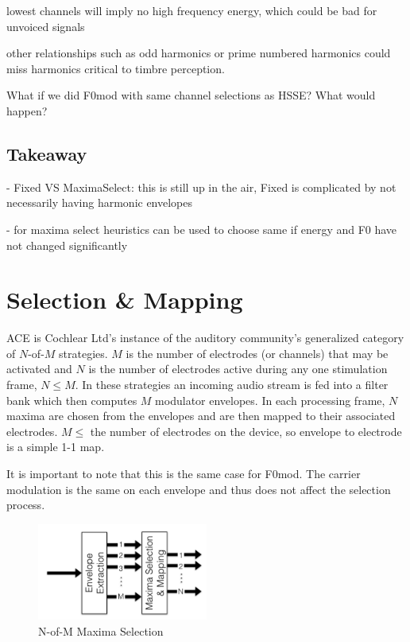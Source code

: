 \documentclass [11pt, proquest] {uwthesis}[2015/03/03]
\begin{document}
lowest channels will imply no high frequency energy, which could be bad for unvoiced signals

other relationships such as odd harmonics or prime numbered harmonics could miss harmonics critical to timbre perception.

What if we did F0mod with same channel selections as HSSE?  What would happen?

\subsection{Takeaway}

 - Fixed VS MaximaSelect: this is still up in the air, Fixed is complicated by not necessarily having harmonic envelopes
 
 - for maxima select heuristics can be used to choose same if energy and F0 have not changed significantly

\section{Selection \& Mapping}

ACE is Cochlear Ltd's instance of the auditory community's generalized category of $N$-of-$M$ strategies.  $M$ is the number of electrodes (or channels) that may be activated and $N$ is the number of electrodes active during any one stimulation frame, $N \leq M$.  In these strategies an incoming audio stream is fed into a filter bank which then computes $M$ modulator envelopes.  In each processing frame, $N$ maxima are chosen from the envelopes and are then mapped to their associated electrodes.  $M \leq$ the number of electrodes on the device, so envelope to electrode is a simple 1-1 map.

It is important to note that this is the same case for F0mod.  The carrier modulation is the same on each envelope and thus does not affect the selection process.

\begin{figure}[!ht]
  \centering
    \includegraphics[width=0.5\textwidth]{ACE_selectionTEMP}   
    \caption{N-of-M Maxima Selection}
\end{figure}
\end{document}
